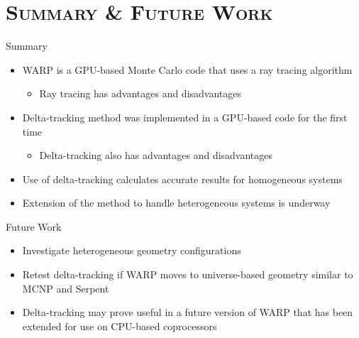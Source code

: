 \documentclass[xcolor=x11names, compress, handout]{beamer}
\renewcommand{\(}{\begin{columns}}
\renewcommand{\)}{\end{columns}}
\newcommand{\<}[1]{\begin{column}{#1}}
\renewcommand{\>}{\end{column}}
\begin{document}
\section{\scshape Summary \& Future Work}
\begin{frame}{Summary}
	\begin{itemize}
	\item{WARP is a GPU-based Monte Carlo code that uses a ray tracing algorithm}
		\begin{itemize}
		\pause
		\item{Ray tracing has advantages and disadvantages}
		\end{itemize}
	\pause
	\item{Delta-tracking method was implemented in a GPU-based code for the first time}
		\begin{itemize}
		\pause
		\item{Delta-tracking also has advantages and disadvantages}
		\end{itemize}
	\pause
	\item{Use of delta-tracking calculates accurate results for homogeneous systems}
	\pause
	\item{Extension of the method to handle heterogeneous systems is underway}
	\end{itemize}
\end{frame}


\begin{frame}{Future Work}
	\begin{itemize}
	\item{Investigate heterogeneous geometry configurations}
	\pause
	\item{Retest delta-tracking if WARP moves to universe-based geometry similar to MCNP and Serpent}
	\pause
	\item{Delta-tracking may prove useful in a future version of WARP that has been extended for use 
	on CPU-based coprocessors}
	\end{itemize}
\end{frame}
\end{document}
